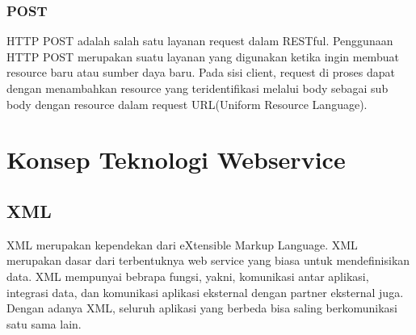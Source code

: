 \documentclass[12pt,a4paper]{article}
\begin{document}
\subsubsection{POST}
HTTP POST adalah salah satu layanan request dalam RESTful. Penggunaan HTTP POST merupakan suatu layanan yang digunakan ketika ingin membuat resource baru atau sumber daya baru. Pada sisi client, request di proses dapat dengan menambahkan resource yang teridentifikasi melalui body sebagai sub body dengan resource dalam request URL(Uniform Resource Language).

\section{Konsep Teknologi Webservice}
\subsection{XML}
XML merupakan kependekan dari eXtensible Markup Language. XML merupakan dasar dari terbentuknya web service yang biasa untuk mendefinisikan data. XML mempunyai bebrapa fungsi, yakni, komunikasi antar aplikasi, integrasi data, dan komunikasi aplikasi eksternal dengan partner eksternal juga. Dengan adanya XML, seluruh aplikasi yang berbeda bisa saling berkomunikasi satu sama lain.
\end{document}
